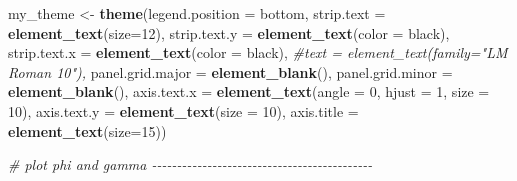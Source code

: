 \documentclass[
]{article}
\newenvironment{Shaded}{\begin{snugshade}}{\end{snugshade}}
\newcommand{\AttributeTok}[1]{\textcolor[rgb]{0.13,0.29,0.53}{#1}}
\newcommand{\CommentTok}[1]{\textcolor[rgb]{0.56,0.35,0.01}{\textit{#1}}}
\newcommand{\DecValTok}[1]{\textcolor[rgb]{0.00,0.00,0.81}{#1}}
\newcommand{\FunctionTok}[1]{\textcolor[rgb]{0.13,0.29,0.53}{\textbf{#1}}}
\newcommand{\NormalTok}[1]{#1}
\newcommand{\OtherTok}[1]{\textcolor[rgb]{0.56,0.35,0.01}{#1}}
\newcommand{\StringTok}[1]{\textcolor[rgb]{0.31,0.60,0.02}{#1}}
\begin{document}
{\begin{Shaded}
\begin{Highlighting}[]
\NormalTok{my\_theme }\OtherTok{\textless{}{-}} \FunctionTok{theme}\NormalTok{(}\AttributeTok{legend.position =} \StringTok{\textquotesingle{}bottom\textquotesingle{}}\NormalTok{, }
                  \AttributeTok{strip.text =} \FunctionTok{element\_text}\NormalTok{(}\AttributeTok{size=}\DecValTok{12}\NormalTok{),}
                  \AttributeTok{strip.text.y =} \FunctionTok{element\_text}\NormalTok{(}\AttributeTok{color =} \StringTok{\textquotesingle{}black\textquotesingle{}}\NormalTok{),}
                  \AttributeTok{strip.text.x =} \FunctionTok{element\_text}\NormalTok{(}\AttributeTok{color =} \StringTok{\textquotesingle{}black\textquotesingle{}}\NormalTok{), }
                  \CommentTok{\#text = element\_text(family="LM Roman 10"),}
                  \AttributeTok{panel.grid.major =} \FunctionTok{element\_blank}\NormalTok{(),}
                  \AttributeTok{panel.grid.minor =} \FunctionTok{element\_blank}\NormalTok{(),}
                  \AttributeTok{axis.text.x =} \FunctionTok{element\_text}\NormalTok{(}\AttributeTok{angle =} \DecValTok{0}\NormalTok{, }\AttributeTok{hjust =} \DecValTok{1}\NormalTok{, }\AttributeTok{size =} \DecValTok{10}\NormalTok{), }
                  \AttributeTok{axis.text.y =} \FunctionTok{element\_text}\NormalTok{(}\AttributeTok{size =} \DecValTok{10}\NormalTok{),}
                  \AttributeTok{axis.title =} \FunctionTok{element\_text}\NormalTok{(}\AttributeTok{size=}\DecValTok{15}\NormalTok{))}

\CommentTok{\# plot phi and gamma {-}{-}{-}{-}{-}{-}{-}{-}{-}{-}{-}{-}{-}{-}{-}{-}{-}{-}{-}{-}{-}{-}{-}{-}{-}{-}{-}{-}{-}{-}{-}{-}{-}{-}{-}{-}{-}{-}{-}{-}{-}{-}{-}{-}}


\end{Highlighting}
\end{Shaded}}
\end{document}
